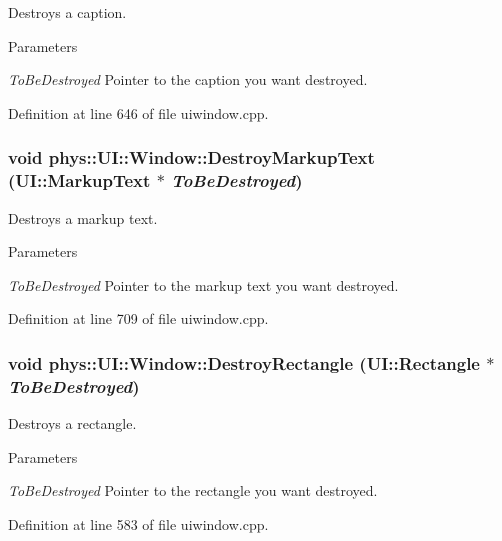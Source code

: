 Destroys a caption. 


\begin{DoxyParams}{Parameters}
\item[{\em ToBeDestroyed}]Pointer to the caption you want destroyed. \end{DoxyParams}


Definition at line 646 of file uiwindow.cpp.

\hypertarget{classphys_1_1UI_1_1Window_aba2506738c7cccfbf8297bf03e431cb8}{
\subsubsection[{DestroyMarkupText}]{\setlength{\rightskip}{0pt plus 5cm}void phys::UI::Window::DestroyMarkupText ({\bf UI::MarkupText} $\ast$ {\em ToBeDestroyed})}}
\label{d4/d86/classphys_1_1UI_1_1Window_aba2506738c7cccfbf8297bf03e431cb8}


Destroys a markup text. 


\begin{DoxyParams}{Parameters}
\item[{\em ToBeDestroyed}]Pointer to the markup text you want destroyed. \end{DoxyParams}


Definition at line 709 of file uiwindow.cpp.

\hypertarget{classphys_1_1UI_1_1Window_ab66c4c1d5f26e3f4fcdd34063b711365}{
\subsubsection[{DestroyRectangle}]{\setlength{\rightskip}{0pt plus 5cm}void phys::UI::Window::DestroyRectangle ({\bf UI::Rectangle} $\ast$ {\em ToBeDestroyed})}}
\label{d4/d86/classphys_1_1UI_1_1Window_ab66c4c1d5f26e3f4fcdd34063b711365}


Destroys a rectangle. 


\begin{DoxyParams}{Parameters}
\item[{\em ToBeDestroyed}]Pointer to the rectangle you want destroyed. \end{DoxyParams}


Definition at line 583 of file uiwindow.cpp.

